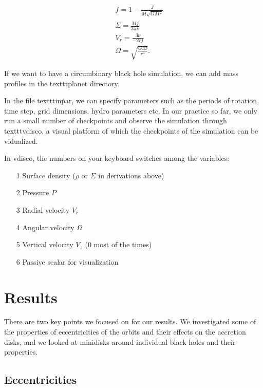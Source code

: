 \documentclass{article}
\begin{document}
\begin{eqnarray}
    && f = 1 - \frac{\dot J}{ \dot M \sqrt{GMr}} \nonumber \\
    && \Sigma = \frac{\dot M f }{ 3 \pi \nu} \nonumber \\
    && V_r = \frac{3\nu}{-2rf} \nonumber \\
    && \Omega = \sqrt{\frac{GM}{r^3}}.
\end{eqnarray}



If we want to have a circumbinary black hole simulation, we can add mass profiles in the texttt{planet} directory. 



In the file texttt{in\.par}, we can specify parameters such as the periods of rotation, time step, grid dimensions, hydro parameters etc.
In our practice so far, we only run a small number of checkpoints and observe the simulation through texttt{vdisco}, a visual
platform of which the checkpoints of the simulation can be vidualized. 

In vdisco, the numbers on your keyboard switches among the variables:
\begin{enumerate}
    \item [1] Surface density ($\rho$ or $\Sigma$ in derivations above)
    \item [2] Pressure $P$
    \item [3] Radial velocity $V_r$
    \item [4] Angular velocity $\Omega$
    \item [5] Vertical velocity $V_z$ ($0$ most of the times)
    \item [6] Passive scalar for visualization 
\end{enumerate}



\section{Results}

There are two key points we focused on for our results. We investigated some of the properties of eccentricities of the orbits and their effects on the accretion disks, and 
we looked at minidisks around individual black holes and their properties.

\subsection{Eccentricities}
\end{document}
